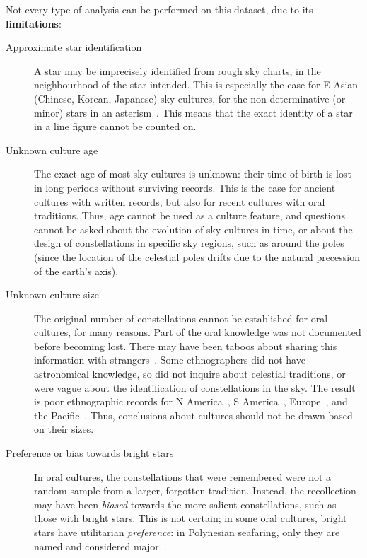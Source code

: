 \documentclass[10pt]{article}
\begin{document}
Not every type of analysis can be performed on this dataset, due to its {\bf limitations}:
%
\begin{description}
	\item[Approximate star identification] A star may be imprecisely identified from rough sky charts, in the neighbourhood of the star intended. This is especially the case for E Asian (Chinese, Korean, Japanese) sky cultures, for the non-determinative (or minor) stars in an asterism~\cite{stephenson1994chinese}. This means that the exact identity of a star in a line figure cannot be counted on.
	\item[Unknown culture age] The exact age of most sky cultures is unknown: their time of birth is lost in long periods without surviving records. This is the case for ancient cultures with written records, but also for recent cultures with oral traditions. Thus, age cannot be used as a culture feature, and questions cannot be asked about the evolution of sky cultures in time, or about the design of constellations in specific sky regions, such as around the poles (since the location of the celestial poles drifts due to the natural precession of the earth's axis).
	\item[Unknown culture size] The original number of constellations cannot be established for oral cultures, for many reasons. Part of the oral knowledge was not documented before becoming lost. There may have been taboos about sharing this information with strangers~\cite{miller1997stars}. Some ethnographers did not have astronomical knowledge, so did not inquire about celestial traditions, or were vague about the identification of constellations in the sky. The result is poor ethnographic records for N America~\cite{miller1997stars,lupo1981conoscenze}, S America~\cite{rybka2018lokono}, Europe~\cite{kaalund1908alfraedhi,svjatskij2007astronomija}, and the Pacific~\cite{HSL}. Thus, conclusions about cultures should not be drawn based on their sizes.
	\item[Preference or bias towards bright stars] In oral cultures, the constellations that were remembered were  not a random sample from a larger, forgotten tradition. Instead, the recollection may have been \emph{biased} towards the more salient constellations, such as those with bright stars. This is not certain; in some oral cultures, bright stars have utilitarian \emph{preference}: in Polynesian seafaring, only they are named and considered major~\cite{feinberg1988polynesian}.
\end{description}
\end{document}
